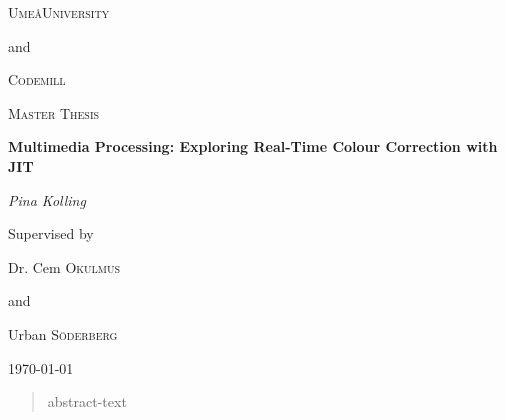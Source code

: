 \documentclass[12pt,a4paper]{article}
\begin{document}
	


\begin{titlepage}
	\centering
	{\scshape\LARGE Ume\aa University \par}
	and \par
	{\scshape\LARGE Codemill \par}
	\vspace{1cm}
	{\scshape\Large Master Thesis \par }
	\vspace{1.5cm}
	{\huge\bfseries  Multimedia Processing: Exploring Real-Time Colour Correction with JIT \par}
	\vspace{2cm}
	{\Large\itshape Pina Kolling\par}
	\vfill
	Supervised by\par
	Dr. Cem \textsc{Okulmus} \par 
	and \par 
	Urban \textsc{Söderberg} 
	
	\vfill
	
	{\large \today \par}
\end{titlepage}

\begin{abstract}
	abstract-text
\end{abstract}




\setcounter{page}{1}



\begin{spacing}{0.45}
	
	
	
	\tableofcontents
	
\end{spacing}








\newpage

\end{document}
